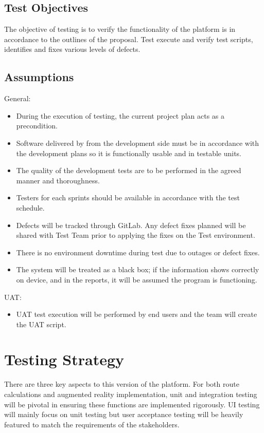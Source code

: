 \documentclass[12pt]{article}
\begin{document}
\subsection{Test Objectives}
The objective of testing is to verify the functionality of the platform is in accordance to the outlines of the proposal. Test execute and verify test scripts, identifies and fixes various levels of defects.

\subsection{Assumptions}
General:
\begin{itemize}
    \item During the execution of testing, the current project plan acts as a precondition.
    \item Software delivered by from the development side must be in accordance with the development plans so it is functionally usable and in testable units. 
    \item The quality of the development tests are to be performed in the agreed manner and thoroughness.
    \item Testers for each sprints should be available in accordance with the test schedule. 
    \item Defects will be tracked through GitLab. Any defect fixes planned will be shared with Test Team prior to applying the fixes on the Test environment.
    \item There is no environment downtime during test due to outages or defect fixes.
    \item The system will be treated as a black box; if the information shows correctly on device, and in the reports, it will be assumed the program is functioning.
\end{itemize}

UAT:
\begin{itemize}
    \item UAT test execution will be performed by end users and the team will create the UAT script.
\end{itemize}

\section{Testing Strategy}
There are three key aspects to this version of the platform. For both route calculations and augmented reality implementation, unit and integration testing will be pivotal in ensuring these functions are implemented rigorously. UI testing will mainly focus on unit testing but user acceptance testing will be heavily featured to match the requirements of the stakeholders.
\end{document}
